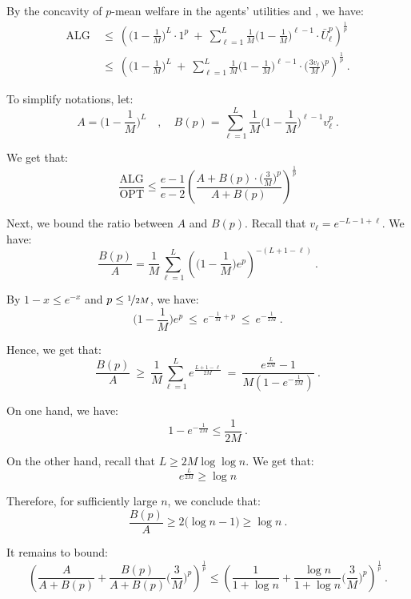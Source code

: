 \documentclass[11pt,letterpaper]{article}
\newcommand{\OPT}{\mathrm{OPT}}
\newcommand{\ALG}{\mathrm{ALG}}
\newcommand{\utility}{U}
\begin{document}
By the concavity of $p$-mean welfare in the agents' utilities and , we have:
\begin{align*}
	\ALG
	&
	~\le~
	\left( \Big(1-\frac{1}{M}\Big)^L \cdot 1^p ~+~ \sum_{\ell=1}^L \frac{1}{M} \Big(1 - \frac{1}{M}\Big)^{\ell-1} \cdot \bar{\utility}_\ell^p \right)^{\frac{1}{p}} \\
	&
	~\le~
	\left( \Big(1-\frac{1}{M}\Big)^L ~+~ \sum_{\ell=1}^L \frac{1}{M} \Big(1 - \frac{1}{M}\Big)^{\ell-1} \cdot \Big( \frac{3v_\ell}{M} \Big)^p \right)^{\frac{1}{p}}
	~.
\end{align*}

To simplify notations, let:
\[
	A = \Big( 1 - \frac{1}{M} \Big)^L
	\quad,\quad
	B(p) = \sum_{\ell=1}^L \frac{1}{M} \Big(1 - \frac{1}{M}\Big)^{\ell-1} v_\ell^p
	~.
\]

We get that:
\[
	\frac{\ALG}{\OPT} \le \frac{e-1}{e-2}  
	\left( 
		\frac{ A + B(p) \cdot \big( \frac{3}{M} \big)^p}{A + B(p)} 
	\right)^{\frac{1}{p}}
\]



Next, we bound the ratio between $A$ and $B(p)$.
Recall that $v_\ell = e^{-L-1+\ell}$. 
We have:
\[
	\frac{B(p)}{A} = \frac{1}{M} \sum_{\ell=1}^L \left(\Big(1-\frac{1}{M}\Big) e^p\right)^{-(L+1-\ell)}
	~.
\]

By $1-x \le e^{-x}$ and $p \le \nicefrac{1}{2M}$, we have:
\[
	\Big(1 - \frac{1}{M}\Big) e^p 
	~\le~ 
	e^{-\frac{1}{M}+p}
	~\le~
	e^{-\frac{1}{2M}} 
	~.
\]







Hence, we get that:
\[
	\frac{B(p)}{A}
	~\ge~ 
	\frac{1}{M} \sum_{\ell=1}^L e^{\frac{L+1-\ell}{2M}}
	~=~ 
	\frac{e^\frac{L}{2M}-1}{M(1-e^{-\frac{1}{2M}})} 
	~.
\]

On one hand, we have:
\[
	1-e^{-\frac{1}{2M}} \le \frac{1}{2M}
	~.
\]

On the other hand, recall that $L \ge 2M \log\log n$.
We get that:
\[
	e^\frac{L}{2M} \ge \log n
\]

Therefore, for sufficiently large $n$, we conclude that:
\[
	\frac{B(p)}{A} \ge 2 \big( \log n - 1 \big) \ge \log n
	~.
\]


It remains to bound:
\begin{equation}
	\label{eqn:hardness-positive-checkpoint}
	\left( \frac{A}{A+B(p)} + \frac{B(p)}{A+B(p)} \Big(\frac{3}{M}\Big)^p \right)^{\frac{1}{p}}
	\le 
	\left( \frac{1}{1+\log n} + \frac{\log n}{1+\log n} \Big( \frac{3}{M} \Big)^p \right)^{\frac{1}{p}}
	~.
\end{equation}
\end{document}
